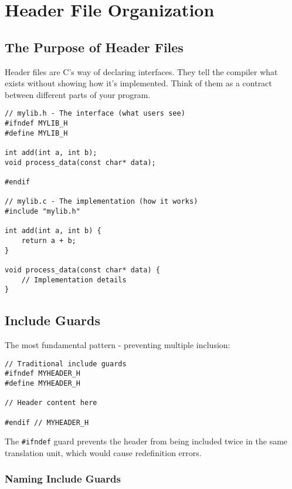 \chapter{Header File Organization}

\section{The Purpose of Header Files}

Header files are C's way of declaring interfaces. They tell the compiler what exists without showing how it's implemented. Think of them as a contract between different parts of your program.

\begin{lstlisting}
// mylib.h - The interface (what users see)
#ifndef MYLIB_H
#define MYLIB_H

int add(int a, int b);
void process_data(const char* data);

#endif

// mylib.c - The implementation (how it works)
#include "mylib.h"

int add(int a, int b) {
    return a + b;
}

void process_data(const char* data) {
    // Implementation details
}
\end{lstlisting}

\section{Include Guards}

The most fundamental pattern - preventing multiple inclusion:

\begin{lstlisting}
// Traditional include guards
#ifndef MYHEADER_H
#define MYHEADER_H

// Header content here

#endif // MYHEADER_H
\end{lstlisting}

\begin{notebox}
The \texttt{\#ifndef} guard prevents the header from being included twice in the same translation unit, which would cause redefinition errors.
\end{notebox}

\subsection{Naming Include Guards}

